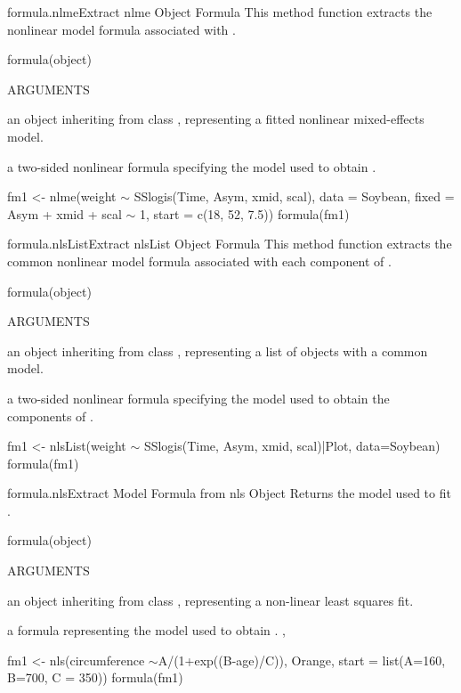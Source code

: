 \documentclass[pdftex]{article} \usepackage{url,graphicx}
\renewcommand{\Twiddle}{\mbox{\(\sim\)}}
\begin{document}
\begin{Helpfile}{formula.nlme}{Extract nlme Object Formula}
This method function extracts the nonlinear model formula
associated with .
\begin{Example}
formula(object)
\end{Example}
\begin{Argument}{ARGUMENTS}
\item[\Co{object:}]
an object inheriting from class , representing
a fitted nonlinear mixed-effects model.
\end{Argument}
a two-sided nonlinear formula specifying the model used to
obtain .
\need 15pt
\vspace{-16pt}
\begin{Example}
fm1 <- nlme(weight {\Twiddle} SSlogis(Time, Asym, xmid, scal), 
            data = Soybean, fixed = Asym + xmid + scal {\Twiddle} 1, 
            start = c(18, 52, 7.5))
formula(fm1)
\end{Example}
\end{Helpfile}
\begin{Helpfile}{formula.nlsList}{Extract nlsList Object Formula}
This method function extracts the common nonlinear model formula
associated with each  component of .
\begin{Example}
formula(object)
\end{Example}
\begin{Argument}{ARGUMENTS}
\item[\Co{object:}]
an object inheriting from class , representing
a list of  objects with a common model.
\end{Argument}
a two-sided nonlinear formula specifying the model used to
obtain the  components of .
\need 15pt
\vspace{-16pt}
\begin{Example}
fm1 <- nlsList(weight {\Twiddle} SSlogis(Time, Asym, xmid, scal)|Plot, 
               data=Soybean)
formula(fm1)
\end{Example}
\end{Helpfile}
\begin{Helpfile}{formula.nls}{Extract Model Formula from nls Object}
Returns the model used to fit .
\begin{Example}
formula(object)
\end{Example}
\begin{Argument}{ARGUMENTS}
\item[\Co{object:}]
an object inheriting from class , representing
a non-linear least squares fit.
\end{Argument}
a formula representing the model used to obtain .
, 
\need 15pt
\vspace{-16pt} 
\begin{Example}
fm1 <- nls(circumference \Twiddle A/(1+exp((B-age)/C)), Orange,
  start = list(A=160, B=700, C = 350))
formula(fm1)
\end{Example}
\end{Helpfile}
\end{document}
